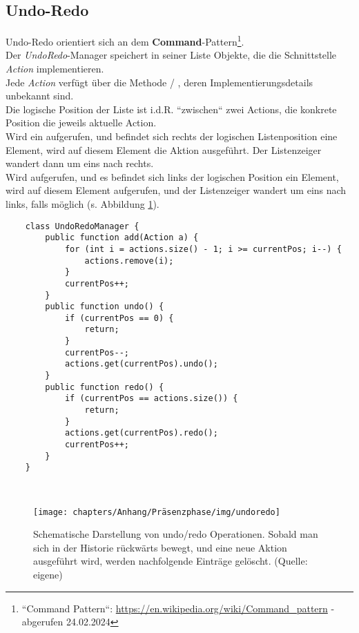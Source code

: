 \subsection*{Undo-Redo}

Undo-Redo orientiert sich an dem \textbf{Command}-Pattern\footnote{
    ``Command Pattern``: \url{https://en.wikipedia.org/wiki/Command_pattern} - abgerufen 24.02.2024
}.\\
Der \textit{UndoRedo}-Manager speichert in seiner Liste Objekte, die die Schnittstelle \textit{Action} implementieren.\\
Jede \textit{Action} verfügt über die Methode  / , deren Implementierungsdetails unbekannt sind.\\
Die logische Position der Liste ist i.d.R. ``zwischen`` zwei Actions, die konkrete Position die jeweils aktuelle Action.\\
Wird ein  aufgerufen, und befindet sich rechts der logischen Listenposition eine Element, wird auf diesem Element die Aktion  ausgeführt.
Der Listenzeiger wandert dann um eins nach rechts.\\
Wird  aufgerufen, und es befindet sich links der logischen Position ein Element, wird auf diesem Element  aufgerufen, und der Listenzeiger wandert um eins nach links, falls möglich (s. Abbildung \ref{fig:undoredo}).

\begin{verbatim}
    class UndoRedoManager {
        public function add(Action a) {
            for (int i = actions.size() - 1; i >= currentPos; i--) {
                actions.remove(i);
            }
            currentPos++;
        }
        public function undo() {
            if (currentPos == 0) {
                return;
            }
            currentPos--;
            actions.get(currentPos).undo();
        }
        public function redo() {
            if (currentPos == actions.size()) {
                return;
            }
            actions.get(currentPos).redo();
            currentPos++;
        }
    }
\end{verbatim}\\

\begin{figure}
    \centering
    \texttt{[image: chapters/Anhang/Präsenzphase/img/undoredo]}
    \caption{Schematische Darstellung von undo/redo Operationen. Sobald man sich in der Historie rückwärts bewegt, und eine neue Aktion ausgeführt wird, werden nachfolgende Einträge gelöscht. (Quelle: eigene)}
    \label{fig:undoredo}
\end{figure}